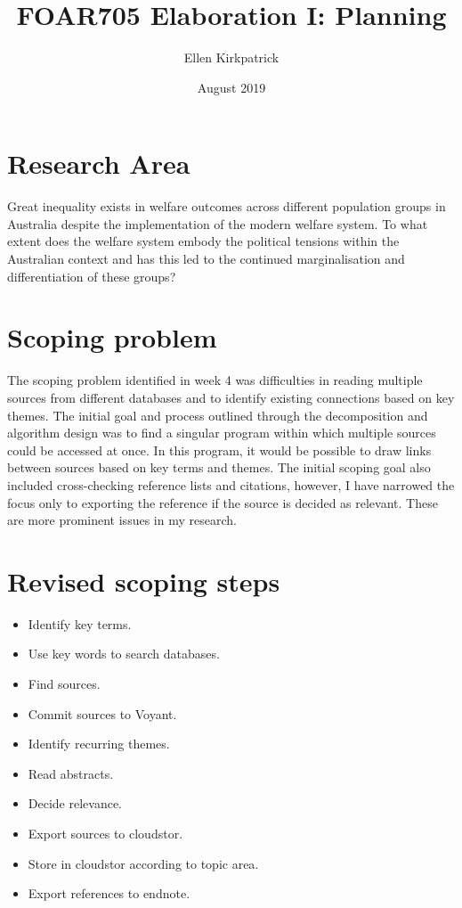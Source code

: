 \documentclass{article}
\title{FOAR705 Elaboration I: Planning}
\author{Ellen Kirkpatrick }
\date{August 2019}
\begin{document}
\maketitle

\section{Research Area}
Great inequality exists in welfare outcomes across different population groups in Australia despite the implementation of the modern welfare system. To what extent does the welfare system embody the political tensions within the Australian context and has this led to the continued marginalisation and differentiation of these groups?

\section{Scoping problem}
The scoping problem identified in week 4 was difficulties in reading multiple sources from different databases and to identify existing connections based on key themes. The initial goal and process outlined through the decomposition and algorithm design was to find a singular program within which multiple sources could be accessed at once. In this program, it would be possible to draw links between sources based on key terms and themes. The initial scoping goal also included cross-checking reference lists and citations, however, I have narrowed the focus only to exporting the reference if the source is decided as relevant. These are more prominent issues in my research.
\section{Revised scoping steps}
\begin{itemize}
    \item Identify key terms.
    \item Use key words to search databases.
    \item Find sources.
    \item Commit sources to Voyant.
    \item Identify recurring themes.
    \item Read abstracts.
    \item Decide relevance.
    \item Export sources to cloudstor.
    \item Store in cloudstor according to topic area.
    \item Export references to endnote. 
    \end{itemize}
\end{document}
